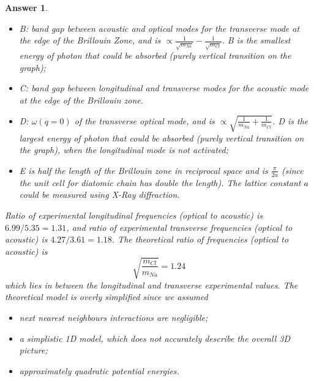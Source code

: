 \documentclass[a4paper]{article}
\newtheorem{ans}{Answer}[section]
\theoremstyle{new}
\begin{document}
\begin{ans}
\begin{itemize}
    \item B: band gap between acoustic and optical modes for the transverse mode at the edge of the Brillouin Zone, and is $\propto\frac{1}{\sqrt{m_{Na}}}-\frac{1}{\sqrt{m_{Cl}}}$. B is the smallest energy of photon that could be absorbed (purely vertical transition on the graph);
    \item C: band gap between longitudinal and transverse modes for the acoustic mode at the edge of the Brillouin zone.
    \item D: $\omega(q=0)$ of the transverse optical mode, and is $\propto \sqrt{\frac{1}{m_{Na}}+\frac{1}{m_{Cl}}}$. D is the largest energy of photon that could be absorbed (purely vertical transition on the graph), when the longitudinal mode is not activated;
    \item E is half the length of the Brillouin zone in reciprocal space and is $\frac{\pi}{2a}$ (since the unit cell for diatomic chain has double the length). The lattice constant $a$ could be measured using X-Ray diffraction.
\end{itemize}
Ratio of experimental longitudinal frequencies (optical to acoustic) is $6.99/5.35=1.31$, and ratio of experimental transverse frequencies (optical to acoustic) is $4.27/3.61=1.18$. The theoretical ratio of frequencies (optical to acoustic) is
$$\sqrt{\frac{m_{Cl}}{m_{Na}}}=1.24$$
which lies in between the longitudinal and transverse experimental values. The theoretical model is overly simplified since we assumed
\begin{itemize}
    \item next nearest neighbours interactions are negligible;
    \item a simplistic 1D model, which does not accurately describe the overall 3D picture;
    \item approximately quadratic potential energies.
\end{itemize}
\end{ans}
\newpage
\end{document}
